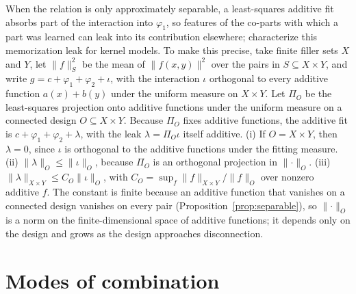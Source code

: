 \documentclass[10pt]{article}
\theoremstyle{plain}
\theoremstyle{remark}
\begin{document}
\noindent
When the relation is only approximately separable, a least-squares additive fit absorbs part of the interaction into $\varphi_1$, so features of the co-parts with which a part was learned can leak into its contribution elsewhere; \citet{lippl2025} characterize this memorization leak for kernel models. To make this precise, take finite filler sets $X$ and $Y$, let $\lVert f \rVert_S^2$ be the mean of $\lVert f(x, y) \rVert^2$ over the pairs in $S \subseteq X \times Y$, and write $g = c + \varphi_1 + \varphi_2 + \iota$, with the interaction $\iota$ orthogonal to every additive function $a(x) + b(y)$ under the uniform measure on $X \times Y$. Let $\Pi_O$ be the least-squares projection onto additive functions under the uniform measure on a connected design $O \subseteq X \times Y$. Because $\Pi_O$ fixes additive functions, the additive fit is $c + \varphi_1 + \varphi_2 + \lambda$, with the leak $\lambda = \Pi_O \iota$ itself additive. (i) If $O = X \times Y$, then $\lambda = 0$, since $\iota$ is orthogonal to the additive functions under the fitting measure. (ii) $\lVert \lambda \rVert_O \le \lVert \iota \rVert_O$, because $\Pi_O$ is an orthogonal projection in $\lVert \cdot \rVert_O$. (iii) $\lVert \lambda \rVert_{X \times Y} \le C_O \lVert \iota \rVert_O$, with $C_O = \sup_f \lVert f \rVert_{X \times Y} / \lVert f \rVert_O$ over nonzero additive $f$. The constant is finite because an additive function that vanishes on a connected design vanishes on every pair (Proposition~\ref{prop:separable}), so $\lVert \cdot \rVert_O$ is a norm on the finite-dimensional space of additive functions; it depends only on the design and grows as the design approaches disconnection.

\section{Modes of combination}
\label{app:forms}
\end{document}
